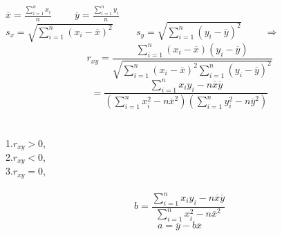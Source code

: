 
\immediate{}
\immediate{}
%
\begin{minipage}[b][14cm][t]{\textwidth}
\begin{center}\large{}\end{center}
\begin{large}
\\
$\overline{x}=\frac{\sum_{i=1}^{n}x_i}{n} \hspace{1cm} \overline{y}=\frac{\sum_{i=1}^{n}y_i}{n}$\\
$s_x=\sqrt{\sum_{i=1}^{n}(x_i-\overline{x})^2} \hspace{1cm} s_y=\sqrt{\sum_{i=1}^{n}(y_i-\overline{y})^2} \hspace{1cm}\Longrightarrow$\\
\[
  r_{xy} = \frac{\sum_{i=1}^{n}(x_i-\overline{x})(y_i-\overline{y})}{\sqrt{\sum_{i=1}^{n}(x_i-\overline{x})^2 \sum_{i=1}^{n}(y_i-\overline{y})^2}}
\]
\[
  = \frac{\sum_{i=1}^{n}x_i y_i - n\overline{x}\overline{y}}{(\sum_{i=1}^{n}x_i^2-n\overline{x}^2) (\sum_{i=1}^{n}y_i^2-n\overline{y}^2)}
\]\\
\\
1.$r_{xy} > 0$,\\
2.$r_{xy} < 0$,\\
3.$r_{xy} = 0$, \\[10pt]
\\
\[
  b=\frac{\sum_{i=1}^{n}x_i y_i - n\overline{x}\overline{y}}{\sum_{i=1}^{n}x_i^2 - n\overline{x}^2}
\]
\[
  a=\overline{y}-b\overline{x}
\]
\end{large}
\end{minipage}
